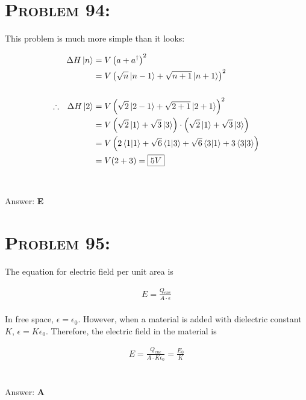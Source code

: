 \documentclass{article}
\begin{document}

\section{\textsc{Problem 94:}} This problem is much more simple than it looks:

\begin{align}
\Delta H \ket{n} &= V \left(   a  +  a^{\dag}  \right)^{2}\nonumber\\
&= V \left(  \sqrt{n} \ket{n - 1} +  \sqrt{n + 1} \ket{n + 1}    \right)^{2} \nonumber\\
\nonumber\\
\therefore \hspace{.1in} \Delta H \ket{2} &= V \left(  \sqrt{2} \ket{2- 1} +  \sqrt{2 + 1} \ket{2 + 1}    \right)^{2} \nonumber\\
&= V \left( \sqrt{2} \ket{1} +  \sqrt{3} \ket{3}    \right) \cdot \left( \sqrt{2} \ket{1} +  \sqrt{3} \ket{3}    \right) \nonumber\\
&= V \left(   2 \braket{1 | 1} + \sqrt{6}\braket{1 | 3} +  \sqrt{6}\braket{3 | 1}  + 3\braket{3 | 3}  \right)\nonumber\\
&= V (2 + 3) = \boxed{5 V}\nonumber
\end{align}
\\\\
Answer: \textbf{\textcolor{ProcessBlue}E}\\


\section{\textsc{Problem 95:}} The equation for electric field per unit area is

\begin{gather}
E = \frac{Q_{enc}}{A \cdot \epsilon }
\end{gather}
\\
In free space, $\epsilon = \epsilon_{0}$. However, when a material is added with dielectric constant $K$, $\epsilon = K \epsilon_{0}$. Therefore, the electric field in the material is

\begin{gather}
E = \frac{Q_{enc}}{A\cdot K \epsilon_{0} } = \frac{E_{0}}{K}\nonumber
\end{gather}
\\\\
Answer: \textbf{\textcolor{ProcessBlue}A}\\
\end{document}

